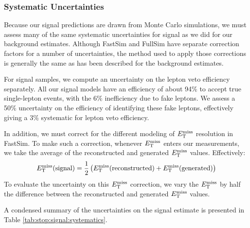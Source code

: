 \subsubsection{Systematic Uncertainties}
\label{sssec:stop:signal:systematics}

Because our signal predictions are drawn from Monte Carlo simulations,
we must assess many of the same systematic uncertainties for signal as
we did for our background estimates. Although FastSim and FullSim have
separate correction factors for a number of uncertainties, the method
used to apply those corrections is generally the same as has been
described for the background estimates.

For signal samples, we compute an uncertainty on the lepton veto
efficiency separately. All our signal models have an efficiency of
about 94\% to accept true single-lepton events, with the 6\%
inefficiency due to fake leptons. We assess a 50\% uncertainty on the
efficiency of identifying these fake leptons, effectively giving a 3\%
systematic for lepton veto efficiency.

In addition, we must correct for the different modeling of $E_\text{T}^\text{miss}$ resolution
in FastSim. To make such a correction, whenever $E_\text{T}^\text{miss}$ enters our
measurements, we take the average of the reconstructed and generated
$E_\text{T}^\text{miss}$ values. Effectively:
\begin{equation}
E_\text{T}^\text{miss} \text{(signal)} = \frac{1}{2} \left( E_\text{T}^\text{miss} \text{(reconstructed)} + E_\text{T}^\text{miss}
  \text{(generated)} \right)
\end{equation}
To evaluate the uncertainty on this $E_\text{T}^\text{miss}$ correction, we vary the
$E_\text{T}^\text{miss}$ by half the difference between the reconstructed and generated
$E_\text{T}^\text{miss}$ values. %

A condensed summary of the uncertainties on the signal estimate is
presented in Table \ref{tab:stop:signal:systematics}.

